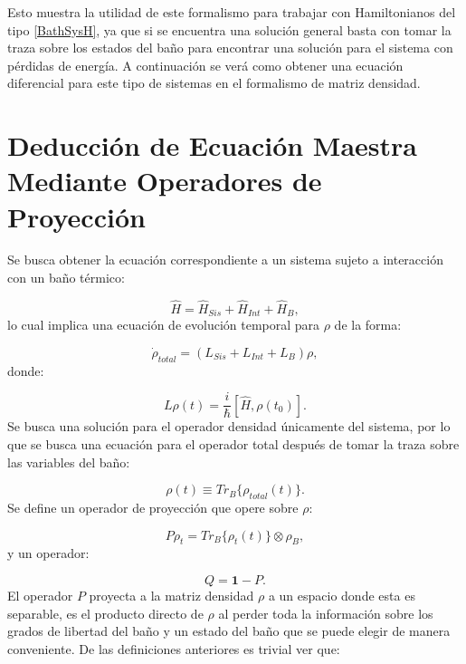 \documentclass[a4paper,10pt]{report}
\begin{document}
Esto muestra la utilidad de este formalismo para trabajar con Hamiltonianos del tipo \ref{BathSysH}, ya que si se encuentra una solución general basta con tomar la traza sobre los estados del baño para encontrar una solución para el sistema con pérdidas de energía. A continuación se verá como obtener una ecuación diferencial para este tipo de sistemas en el formalismo de matriz densidad.

\section{Deducción de Ecuación Maestra Mediante Operadores de Proyección}

Se busca obtener la ecuación correspondiente a un sistema sujeto a interacción con un baño térmico:

\begin{equation}
\hat{H} = \hat{H}_{Sis}+\hat{H}_{Int}+\hat{H}_B,
\end{equation} lo cual implica una ecuación de evolución temporal para $\rho$ de la forma:

\begin{equation}\label{LMeq}
\dot{\rho}_{total} = (L_{Sis}+L_{Int}+L_B)\rho,
\end{equation}donde:

\begin{equation}\label{defL}
L\rho(t) = \frac{i}{\hbar}[\hat{H},\rho(t_0)].
\end{equation} Se busca una solución para el operador densidad únicamente del sistema, por lo que se busca una ecuación para el operador total después de tomar la traza sobre las variables del baño:

\begin{equation}
\rho(t) \equiv Tr_B\{\rho_{total}(t)\}.
\end{equation} Se define un operador de proyección \cite{ZollerQN} que opere sobre $ \rho $:

\begin{equation}
P\rho_t = Tr_B\{\rho_{t}(t)\}\otimes \rho_B,
\end{equation} y un operador:

\begin{equation}
Q = \mathbf{1}-P.
\end{equation} El operador $P$ proyecta a la matriz densidad $\rho$ a un espacio donde esta es separable, es el producto directo de $\rho$ al perder toda la información sobre los grados de libertad del baño y un estado del baño que se puede elegir de manera conveniente. De las definiciones anteriores es trivial ver que:
\end{document}
